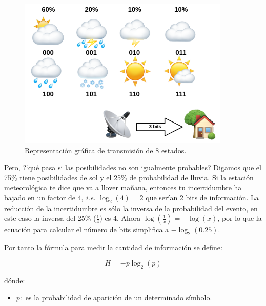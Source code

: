 \documentclass[a4paper,12pt]{article}
\begin{document}
\begin{figure}[H]
	\begin{center}
	\includegraphics[width=0.9\textwidth]{geron_2.png}
  	\caption{Representación gráfica de transmisión de 8 estados.}
  	\label{fig:geron2}
  	\end{center}
\end{figure}

Pero, ?`qué pasa si las posibilidades no son igualmente probables? Digamos que el 75\% tiene posibilidades de sol y el 25\% de probabilidad de lluvia. Si la estación meteorológica te dice que va a llover mañana, entonces tu incertidumbre ha bajado en un factor de 4, \textit{i.e.} $\log_2(4)=2$ que serían 2 bits de información. La reducción de la incertidumbre es sólo la inversa de la probabilidad del evento, en este caso la inversa del 25\% ($\frac{1}{4}$) es 4. Ahora $\log(\frac{1}{x})=-\log(x)$, por lo que la ecuación para calcular el número de bits simplifica a $-\log_2(0.25)$. 

%

Por tanto la fórmula para medir la cantidad de información se define:

$$ H = -p \log_2(p)$$

dónde:
\begin{itemize}
	\item $p:$ es la probabilidad de aparición de un determinado símbolo.
\end{itemize}
\end{document}
